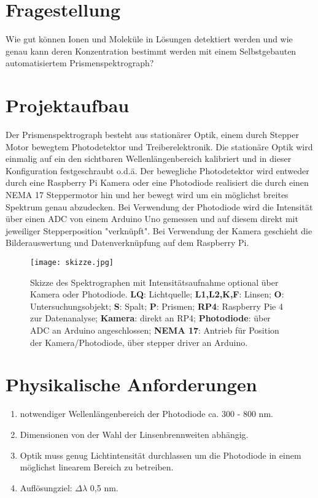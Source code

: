 \section*{Fragestellung}
Wie gut können Ionen und Moleküle in Lösungen detektiert werden und wie genau kann deren Konzentration bestimmt werden mit einem Selbstgebauten automatisiertem Prismenspektrograph?

\section*{Projektaufbau}
Der Prismenspektrograph besteht aus stationärer Optik, einem durch Stepper Motor bewegtem Photodetektor und Treiberelektronik.
Die stationäre Optik wird einmalig auf ein den sichtbaren Wellenlängenbereich kalibriert und in dieser Konfiguration festgeschraubt o.d.ä.
Der bewegliche Photodetektor wird entweder durch eine Raspberry Pi Kamera oder eine Photodiode realisiert die durch einen NEMA 17 Steppermotor hin und her bewegt wird um ein möglichst breites Spektrum genau abzudecken.
Bei Verwendung der Photodiode wird die Intensität über einen ADC von einem Arduino Uno gemessen und auf diesem direkt mit jeweiliger Stepperposition "verknüpft".
Bei Verwendung der Kamera geschieht die Bilderauswertung und Datenverknüpfung auf dem Raspberry Pi.

\begin{figure}[H]
    \centering
    \texttt{[image: skizze.jpg]}
    \caption{
        Skizze des Spektrographen mit Intensitätsaufnahme optional über Kamera oder Photodiode.
        \textbf{LQ}: Lichtquelle; 
        \textbf{L1,L2,K,F}: Linsen; 
        \textbf{O}: Untersuchungsobjekt; 
        \textbf{S}: Spalt; 
        \textbf{P}: Prismen; 
        \textbf{RP4}: Raspberry Pie 4 zur Datenanalyse; 
        \textbf{Kamera}: direkt an RP4; 
        \textbf{Photodiode}: über ADC an Arduino angeschlossen; 
        \textbf{NEMA 17}: Antrieb für Position der Kamera/Photodiode, über stepper driver an Arduino.
    }
    \label{fig:skizze}
\end{figure}


\section*{Physikalische Anforderungen}
\begin{enumerate}
    \item notwendiger Wellenlängenbereich der Photodiode ca. 300 - 800 nm.
    \item Dimensionen von der Wahl der Linsenbrennweiten abhängig.
    \item Optik muss genug Lichtintensität durchlassen um die Photodiode in einem möglichst linearem Bereich zu betreiben.
    \item Auflösungziel: $\Delta \lambda$ 0,5 nm.
\end{enumerate}


